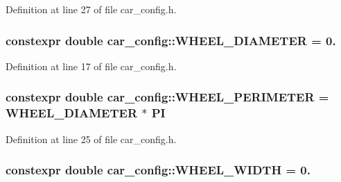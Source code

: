 Definition at line 27 of file car\+\_\+config.\+h.

\subsubsection[{\texorpdfstring{W\+H\+E\+E\+L\+\_\+\+D\+I\+A\+M\+E\+T\+ER}{WHEEL_DIAMETER}}]{\setlength{\rightskip}{0pt plus 5cm}constexpr double car\+\_\+config\+::\+W\+H\+E\+E\+L\+\_\+\+D\+I\+A\+M\+E\+T\+ER = 0.}\hypertarget{namespacecar__config_a6f064e331d6d85d46028dfbe75f063dd}{}\label{namespacecar__config_a6f064e331d6d85d46028dfbe75f063dd}


Definition at line 17 of file car\+\_\+config.\+h.

\subsubsection[{\texorpdfstring{W\+H\+E\+E\+L\+\_\+\+P\+E\+R\+I\+M\+E\+T\+ER}{WHEEL_PERIMETER}}]{\setlength{\rightskip}{0pt plus 5cm}constexpr double car\+\_\+config\+::\+W\+H\+E\+E\+L\+\_\+\+P\+E\+R\+I\+M\+E\+T\+ER = {\bf W\+H\+E\+E\+L\+\_\+\+D\+I\+A\+M\+E\+T\+ER} $\ast$ {\bf PI}}\hypertarget{namespacecar__config_a46fe00906da07d2e030b586a634cd907}{}\label{namespacecar__config_a46fe00906da07d2e030b586a634cd907}


Definition at line 25 of file car\+\_\+config.\+h.

\subsubsection[{\texorpdfstring{W\+H\+E\+E\+L\+\_\+\+W\+I\+D\+TH}{WHEEL_WIDTH}}]{\setlength{\rightskip}{0pt plus 5cm}constexpr double car\+\_\+config\+::\+W\+H\+E\+E\+L\+\_\+\+W\+I\+D\+TH = 0.}\hypertarget{namespacecar__config_ace29186cd9605cde6edd0fd9b814df63}{}\label{namespacecar__config_ace29186cd9605cde6edd0fd9b814df63}


